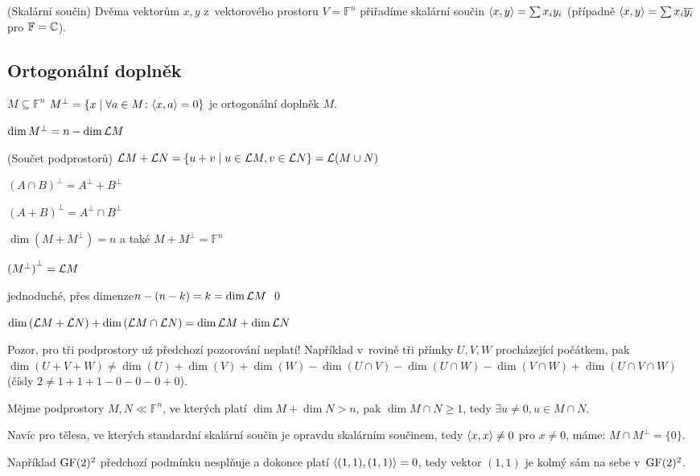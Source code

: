 \df (Skalární součin) Dvěma vektorům $x,y$ z~vektorového prostoru $V = \mathbb{F}^n$
přiřadíme skalární součin ${\langle x,y\rangle} = \sum x_iy_i$ \quad(případně ${\langle x,y\rangle} = \sum
x_i\overline{y_i}$ pro $\mathbb{F} = \mathbb{C}$).

\subsection{Ortogonální doplněk}

\df $M \subseteq \mathbb{F}^n$ \quad $M^\bot = \{x \mid \forall a\in M\colon {\langle x,a\rangle} = 0\}$ je
ortogonální doplněk $M$.

\poz $\dim M^\bot = n - \dim \mathcal{L} M$

\df (Součet podprostorů) $\mathcal{L} M + \mathcal{L} N = \left\{ u + v \mid u \in \mathcal{L} M, v \in \mathcal{L} N \right\} = \mathcal{L}{(M\cup N)}$

\poz $(A \cap B)^\bot = A^\bot + B^\bot$

\poz $(A + B)^\bot = A^\bot \cap B^\bot$

\poz $\dim(M+M^\bot) = n$ a také $M + M^\bot = \mathbb{F}^n$

\poz ${(M^\bot)}^\bot = \mathcal{L} M$

\dk \uv{$\supseteq$} jednoduché, \uv{$\subseteq$} přes dimenze\quad $n-(n-k) = k =
\dim \mathcal{L} M$ \qed

\poz $\dim\left(\mathcal{L} M + \mathcal{L} N\right) + \dim\left(\mathcal{L} M \cap \mathcal{L} N\right) = \dim \mathcal{L} M + \dim \mathcal{L} N$

Pozor, pro tři podprostory už předchozí pozorování neplatí! Například v~rovině tři
přímky $U,V,W$ procházející počátkem, pak $\dim(U + V + W) \neq \dim(U) + \dim(V) +
\dim(W) - \dim(U \cap V) - \dim(U \cap W) - \dim(V \cap W) + \dim(U \cap V \cap W)$
(čísly $2 \neq 1 + 1 + 1 - 0 - 0 - 0 + 0$).

\dsl Mějme podprostory $M,N \ll \mathbb{F}^n$, ve kterých platí $\dim M + \dim N > n$,
pak $\dim M \cap N \ge 1$, tedy $\exists u \neq 0, u \in M\cap N$.

\dsl Navíc pro tělesa, ve kterých standardní skalární součin je opravdu skalárním
součinem, tedy ${\langle x,x\rangle} \neq 0$ pro $x\neq 0$, máme:  $M\cap M^\bot = \{0\}$.

Například $\mathrm{GF}(2)^2$ předchozí podmínku nesplňuje a dokonce platí ${\langle (1,1), (1,1)\rangle} =
0$, tedy vektor $(1,1)$ je kolmý sám na sebe v~$\mathrm{GF}(2)^2$.

